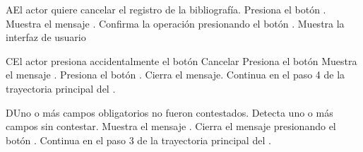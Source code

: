 

\begin{UCtrayectoriaA}{A}{El actor quiere cancelar el registro de la bibliografía.}
	\UCpaso[\UCactor] Presiona el botón .
    \UCpaso Muestra el mensaje .
    \UCpaso[\UCactor] Confirma la operación presionando el botón .
    \UCpaso Muestra la interfaz de usuario 
\end{UCtrayectoriaA}



\begin{UCtrayectoriaA}{C}{El actor presiona accidentalmente el botón Cancelar}
	\UCpaso[\UCactor] Presiona el botón 
    \UCpaso Muestra el mensaje .
    \UCpaso[\UCactor] Presiona el botón .
    \UCpaso Cierra el mensaje.
    \UCpaso Continua en el paso 4 de la trayectoria principal del .
\end{UCtrayectoriaA}


\begin{UCtrayectoriaA}{D}{Uno o más campos obligatorios no fueron contestados.}
	\UCpaso Detecta uno o más campos sin contestar.
    \UCpaso Muestra el mensaje .
    \UCpaso[\UCactor] Cierra el mensaje presionando el botón .
    \UCpaso Continua en el paso 3 de la trayectoria principal del .
\end{UCtrayectoriaA}

